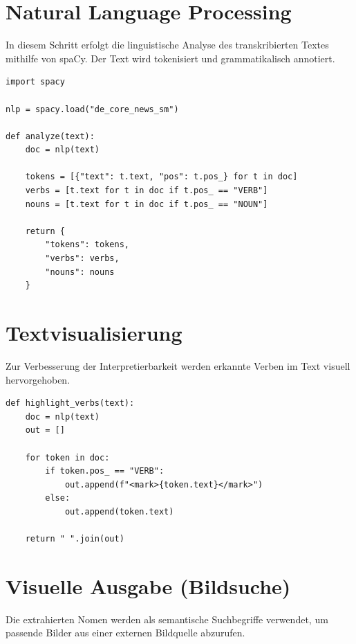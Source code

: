 \section{Natural Language Processing}

In diesem Schritt erfolgt die linguistische Analyse des transkribierten Textes mithilfe von spaCy. Der Text wird tokenisiert und grammatikalisch annotiert.

\begin{lstlisting}[caption={nlp_analysis.py – Tokenisierung und Part-of-Speech Tagging}]
import spacy

nlp = spacy.load("de_core_news_sm")

def analyze(text):
    doc = nlp(text)

    tokens = [{"text": t.text, "pos": t.pos_} for t in doc]
    verbs = [t.text for t in doc if t.pos_ == "VERB"]
    nouns = [t.text for t in doc if t.pos_ == "NOUN"]

    return {
        "tokens": tokens,
        "verbs": verbs,
        "nouns": nouns
    }
\end{lstlisting}

\section{Textvisualisierung}

Zur Verbesserung der Interpretierbarkeit werden erkannte Verben im Text visuell hervorgehoben.

\begin{lstlisting}[caption={nlp_analysis.py – Markierung von Verben im Text}]
def highlight_verbs(text):
    doc = nlp(text)
    out = []

    for token in doc:
        if token.pos_ == "VERB":
            out.append(f"<mark>{token.text}</mark>")
        else:
            out.append(token.text)

    return " ".join(out)
\end{lstlisting}

\section{Visuelle Ausgabe (Bildsuche)}

Die extrahierten Nomen werden als semantische Suchbegriffe verwendet, um passende Bilder aus einer externen Bildquelle abzurufen.

